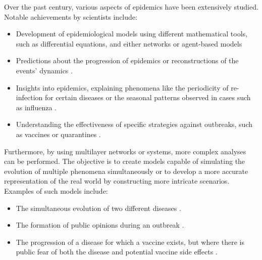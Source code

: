 Over the past century, various aspects of epidemics have been extensively studied. Notable achievements by scientists include:
\begin{itemize}
	\item Development of epidemiological models using different mathematical tools, such as differential equations, and either networks or agent-based models
	\item Predictions about the progression of epidemics or reconstructions of the events' dynamics \cite{diekmann2000mathematical, brauer2012mathematical, Ledder_2023}.
	\item Insights into epidemics, explaining phenomena like the periodicity of re-infection for certain diseases or the seasonal patterns observed in cases such as influenza \cite{Bjoernstad2016}.
	\item Understanding the effectiveness of specific strategies against outbreaks, such as vaccines or quarantines \cite{Wang_2015_review}.
\end{itemize}
Furthermore, by using multilayer networks or systems, more complex analyses can be performed. The objective is to create models capable of simulating the evolution of multiple phenomena simultaneously or to develop a more accurate representation of the real world by constructing more intricate scenarios. Examples of such models include:
\begin{itemize}
	\item The simultaneous evolution of two different diseases \cite{DeDomenico2016}.
	\item The formation of public opinions during an outbreak \cite{teslya2022}.
	\item The progression of a disease for which a vaccine exists, but where there is public fear of both the disease and potential vaccine side effects \cite{Epstein_2021}.
\end{itemize}

